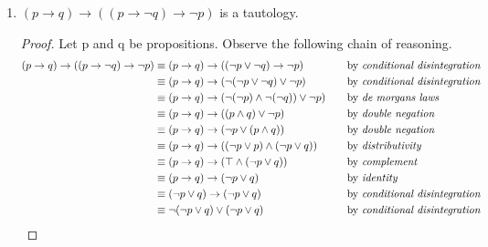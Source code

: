 \documentclass{article}
\begin{document}
\begin {enumerate}
\begin{enumerate}
\hrulefill

      \item
        $(p \rightarrow q) \rightarrow ((p \rightarrow \neg q) \rightarrow \neg p)$ is a tautology.

        \vspace{2ex}
        \begin{proof}
        Let p and q be propositions. Observe the following chain of reasoning.
        \begin{align*}
          (p \rightarrow q) \rightarrow ((p \rightarrow \neg q) \rightarrow \neg p)
            &\equiv(p \rightarrow q) \rightarrow ((\neg p \lor \neg q) \rightarrow \neg p)
              &\quad
              &\text{by \emph{conditional disintegration}}
              \\
            &\equiv(p \rightarrow q) \rightarrow (\neg(\neg p \lor \neg q) \lor \neg p)
              &\quad
              &\text{by \emph{conditional disintegration}}
              \\
            &\equiv(p \rightarrow q) \rightarrow (\neg(\neg p)\land \neg(\neg q)) \lor \neg p)
              &\quad
              &\text{by \emph{de morgans laws}}
              \\
            &\equiv(p \rightarrow q) \rightarrow ((p \land q) \lor \neg p)
              &\quad
              &\text{by \emph{double negation}}
              \\
            &\equiv(p \rightarrow q) \rightarrow (\neg p \lor(p \land q))
              &\quad
              &\text{by \emph{double negation}}
              \\
            &\equiv(p \rightarrow q) \rightarrow ((\neg p \lor p) \land (\neg p \lor q))
              &\quad
              &\text{by \emph{distributivity}}
              \\
            &\equiv(p \rightarrow q) \rightarrow (\top \land (\neg p \lor q))
              &\quad
              &\text{by \emph{complement}}
              \\
            &\equiv(p \rightarrow q) \rightarrow (\neg p \lor q)
              &\quad
              &\text{by \emph{identity}}
              \\
            &\equiv(\neg p \lor q) \rightarrow (\neg p \lor q)
              &\quad
              &\text{by \emph{conditional disintegration}}
              \\
            &\equiv \neg(\neg p \lor q) \lor (\neg p \lor q)
              &\quad
              &\text{by \emph{conditional disintegration}}

\end{align*}
\end{proof}
\end{enumerate}
\end{enumerate}
\end{document}

